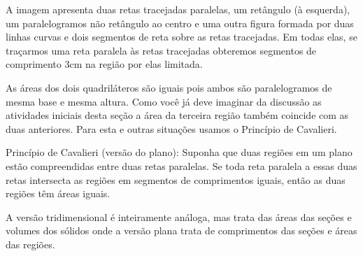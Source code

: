 \label{\detokenize{GE504-9:organizando-as-ideias-principio-de-cavalieri}}\label{\detokenize{GE504-9::doc}}
A imagem apresenta duas retas tracejadas paralelas, um retângulo (à esquerda), um paralelogramos não retângulo ao centro e uma outra figura formada por duas linhas curvas e dois segmentos de reta sobre as retas tracejadas. Em todas elas, se traçarmos uma reta paralela às retas tracejadas obteremos segmentos de comprimento 3cm na região por elas limitada.

\begin{figure}[H]
\centering

\end{figure}

As áreas dos dois quadriláteros são iguais pois ambos são paralelogramos de mesma base e mesma altura. Como você já deve imaginar da discussão as atividades iniciais desta seção a área da terceira região também coincide com as duas anteriores. Para esta e outras situações usamos o Princípio de Cavalieri.

\begin{observationtitle}{Princípio de Cavalieri (versão do plano):} Suponha que duas regiões em um plano estão compreendidas entre duas retas paralelas. Se toda reta paralela a essas duas retas intersecta as regiões em segmentos de comprimentos iguais, então as duas regiões têm áreas iguais.
\end{observationtitle}

A versão tridimensional é inteiramente análoga, mas trata das áreas das seções e volumes dos sólidos onde a versão plana trata de comprimentos das seções e áreas das regiões.

